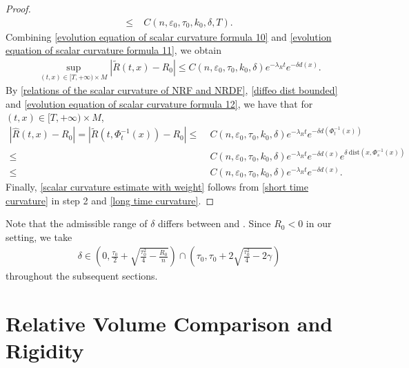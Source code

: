 \documentclass[12pt]{amsart}
\begin{document}
\begin{proof}
\begin{equation}
\begin{split}
        \leq&\; C(n,\varepsilon_0,\tau_0, k_0, \delta, T).
    \end{split}
\end{equation}
Combining \eqref{evolution equation of scalar curvature formula 10} and \eqref{evolution equation of scalar curvature formula 11}, we obtain 
\begin{equation}\label{evolution equation of scalar curvature formula 12}
    \begin{split}
        \sup_{(t, x)\in [T, +\infty)\times M}|\tilde{R}(t, x) - R_0| \leq C(n,\varepsilon_0,\tau_0, k_0, \delta) e^{-\lambda_R t} e^{- \delta d(x)}.
    \end{split}
\end{equation}
By \eqref{relations of the scalar curvature of NRF and NRDF}, \eqref{diffeo dist bounded} and \eqref{evolution equation of scalar curvature formula 12}, we have that for $(t, x)\in [T, +\infty) \times M$,
\begin{equation}\label{long time curvature}
    \begin{split}
        |\hat{R}(t, x) - R_0| = |\tilde{R}(t, \Phi_t^{-1}(x)) - R_0| \leq&\; C(n,\varepsilon_0,\tau_0, k_0, \delta) e^{-\lambda_R t} e^{- \delta d(\Phi_t^{-1}(x))} \\
        \leq&\; C(n,\varepsilon_0,\tau_0, k_0, \delta) e^{-\lambda_R t} e^{- \delta d(x)} e^{\delta\ \mathrm{dist}(x, \Phi^{-1}_s(x))}\\
        \leq&\; C(n,\varepsilon_0,\tau_0, k_0, \delta) e^{-\lambda_R t} e^{- \delta d(x)}. 
    \end{split}
\end{equation}
Finally, \eqref{scalar curvature estimate with weight} follows from \eqref{short time curvature} in step 2 and \eqref{long time curvature}. 
\end{proof}
Note that the admissible range of $\delta$ differs between  and . Since $R_0<0$ in our setting, we take
\begin{align}\label{final region of delta}
    \delta \in \left( 0, \frac{\tau_0}{2} + \sqrt{\frac{\tau_0^2}{4} - \frac{R_0}{n}} \right) \cap \left( \tau_0, \tau_0 + 2\sqrt{\frac{\tau_0^2}{4} - 2\gamma} \right)
\end{align}
throughout the subsequent sections. 
\section{Relative Volume Comparison and Rigidity}\label{sec: relative_volume}
\end{document}
